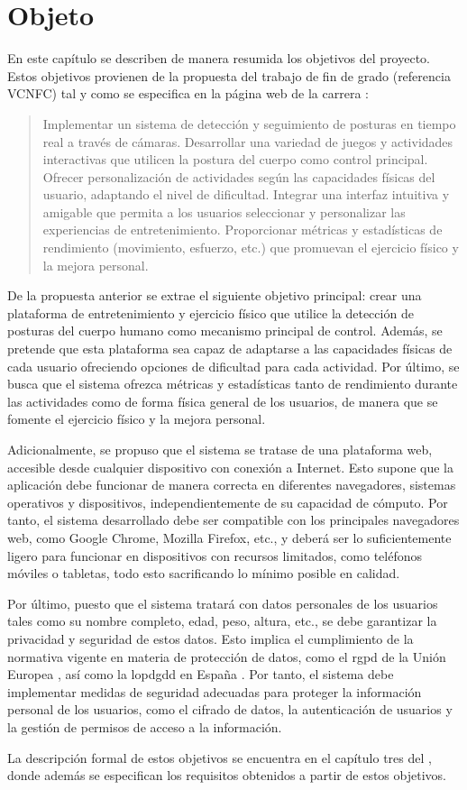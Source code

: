 \chapter{Objeto}
\label{cap:objeto}
En este capítulo se describen de manera resumida los objetivos del proyecto.
Estos objetivos provienen de la propuesta del trabajo de fin de grado
(referencia VCNFC) tal y como se especifica en la página web de la carrera
\cite{diaweb}:
\begin{quote}
    Implementar un sistema de detección y seguimiento de posturas en tiempo real
    a través de cámaras.  Desarrollar una variedad de juegos y actividades
    interactivas que utilicen la postura del cuerpo como control principal.
    Ofrecer personalización de actividades según las capacidades físicas del
    usuario, adaptando el nivel de dificultad. Integrar una interfaz intuitiva y
    amigable que permita a los usuarios seleccionar y personalizar las
    experiencias de entretenimiento. Proporcionar métricas y estadísticas de
    rendimiento (movimiento, esfuerzo, etc.) que promuevan el ejercicio físico y
    la mejora personal.
\end{quote}

De la propuesta anterior se extrae el siguiente objetivo principal: crear una
plataforma de entretenimiento y ejercicio físico que utilice la detección de
posturas del cuerpo humano como mecanismo principal de control. Además, se
pretende que esta plataforma sea capaz de adaptarse a las capacidades físicas de
cada usuario ofreciendo opciones de dificultad para cada actividad. Por último,
se busca que el sistema ofrezca métricas y estadísticas tanto de rendimiento
durante las actividades como de forma física general de los usuarios, de manera
que se fomente el ejercicio físico y la mejora personal.

Adicionalmente, se propuso que el sistema se tratase de una plataforma web,
accesible desde cualquier dispositivo con conexión a Internet. Esto supone que
la aplicación debe funcionar de manera correcta en diferentes navegadores,
sistemas operativos y dispositivos, independientemente de su capacidad de
cómputo. Por tanto, el sistema desarrollado debe ser compatible con los
principales navegadores web, como Google Chrome, Mozilla Firefox, etc., y deberá
ser lo suficientemente ligero para funcionar en dispositivos con recursos
limitados, como teléfonos móviles o tabletas, todo esto sacrificando lo mínimo
posible en calidad.

Por último, puesto que el sistema tratará con datos personales de los usuarios
tales como su nombre completo, edad, peso, altura, etc., se debe garantizar la
privacidad y seguridad de estos datos. Esto implica el cumplimiento de la
normativa vigente en materia de protección de datos, como el \gls{rgpd} de la
Unión Europea \parencite{EuropeanParliament2016a}, así como la \gls{lopdgdd}
en España \parencite{lopdgdd}. Por tanto, el sistema debe implementar medidas de
seguridad adecuadas para proteger la información personal de los usuarios, como
el cifrado de datos, la autenticación de usuarios y la gestión de permisos de
acceso a la información.

La descripción formal de estos objetivos se encuentra en el capítulo tres del
\primerAnexo, donde además se especifican los requisitos obtenidos a partir de
estos objetivos.
